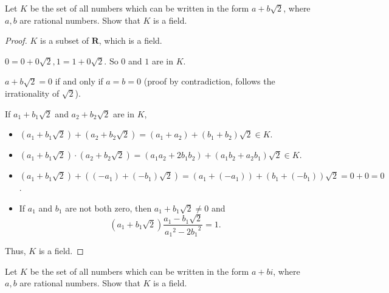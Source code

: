 \begin{exercise}
    Let $K$ be the set of all numbers which can be written in the form $a + b\sqrt{2}$, where $a, b$ are rational numbers. Show that $K$ is a field.
\end{exercise}

\begin{proof}
    $K$ is a subset of $\mathbf{R}$, which is a field.

    $0 = 0 + 0\sqrt{2}, 1 = 1 + 0\sqrt{2}$. So $0$ and $1$ are in $K$.

    $a + b\sqrt{2} = 0$ if and only if $a = b = 0$ (proof by contradiction, follows the irrationality of $\sqrt{2}$).

    If $a_{1} + b_{1}\sqrt{2}$ and $a_{2} + b_{2}\sqrt{2}$ are in $K$,
    \begin{itemize}
        \item $(a_{1} + b_{1}\sqrt{2}) + (a_{2} + b_{2}\sqrt{2}) = (a_{1} + a_{2}) + (b_{1} + b_{2})\sqrt{2} \in K$.
        \item $(a_{1} + b_{1}\sqrt{2})\cdot (a_{2} + b_{2}\sqrt{2}) = (a_{1}a_{2} + 2b_{1}b_{2}) + (a_{1}b_{2} + a_{2}b_{1})\sqrt{2} \in K$.
        \item $(a_{1} + b_{1}\sqrt{2}) + ((-a_{1}) + (-b_{1})\sqrt{2}) = (a_{1} + (-a_{1})) + (b_{1} + (-b_{1}))\sqrt{2} = 0 + 0 = 0$.
        \item If $a_{1}$ and $b_{1}$ are not both zero, then $a_{1} + b_{1}\sqrt{2}\ne 0$ and
              \[
                  (a_{1} + b_{1}\sqrt{2})\frac{a_{1} - b_{1}\sqrt{2}}{{a_{1}}^{2} - 2{b_{1}}^{2}} = 1.
              \]
    \end{itemize}

    Thus, $K$ is a field.
\end{proof}

\begin{exercise}
    Let $K$ be the set of all numbers which can be written in the form $a + bi$, where $a, b$ are rational numbers. Show that $K$ is a field.
\end{exercise}

